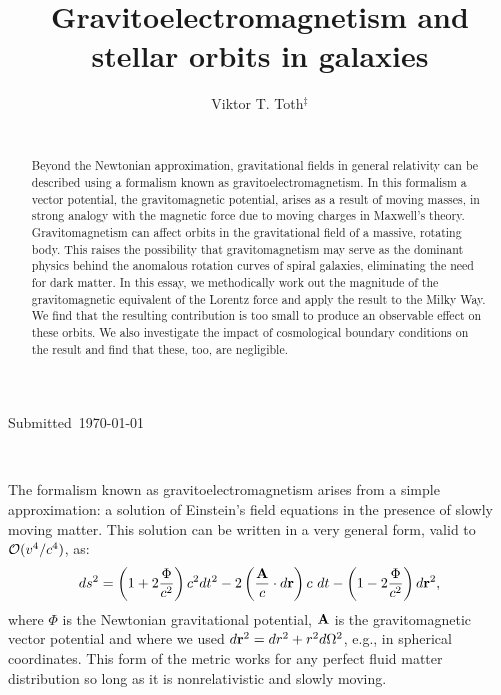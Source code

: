 \documentclass{ws-ijmpd}
\begin{document}
\title{Gravitoelectromagnetism and stellar orbits in galaxies}

\author{Viktor T. Toth$^{\ddag}$\\~\\}
\address{$^\ddag$
Ottawa, Ontario K1N 9H5, Canada\\vttoth@vttoth.com}

\maketitle

\begin{history}
{Submitted~\today\par}
\end{history}

\begin{abstract}
Beyond the Newtonian approximation, gravitational fields in general relativity can be described using a formalism known as gravitoelectromagnetism. In this formalism a vector potential, the gravitomagnetic potential, arises as a result of moving masses, in strong analogy with the magnetic force due to moving charges in Maxwell's theory. Gravitomagnetism can affect orbits in the gravitational field of a massive, rotating body. This raises the possibility that gravitomagnetism may serve as the dominant physics behind the anomalous rotation curves of spiral galaxies, eliminating the need for dark matter. In this essay, we methodically work out the magnitude of the gravitomagnetic equivalent of the Lorentz force and apply the result to the Milky Way. We find that the resulting contribution is too small to produce an observable effect on these orbits. We also investigate the impact of cosmological boundary conditions on the result and find that these, too, are negligible.
\end{abstract}

~\par



The formalism known as gravitoelectromagnetism arises from a simple approximation: a solution of Einstein's field equations in the presence of slowly moving matter. This solution can be written in a very general form, valid to ${\cal O}(v^4/c^4)$, as\cite{Weinberg1972,Padmanabhan2010}:
\begin{align}
ds^2=\left(1+2\frac{\Phi}{c^2}\right)c^2dt^2-2\left(\frac{{\bf A}}{c}\cdot d{\bf r}\right)c~dt-\left(1-2\frac{\Phi}{c^2}\right)d{\bf r}^2,\label{eq:metric}
\end{align}
where $\Phi$ is the Newtonian gravitational potential, ${\bf A}$ is the gravitomagnetic vector potential and where we used $d{\bf r}^2=dr^2+r^2d\Omega^2$, e.g., in spherical coordinates. This form of the metric works for any perfect fluid matter distribution so long as it is nonrelativistic and slowly moving.
\end{document}
